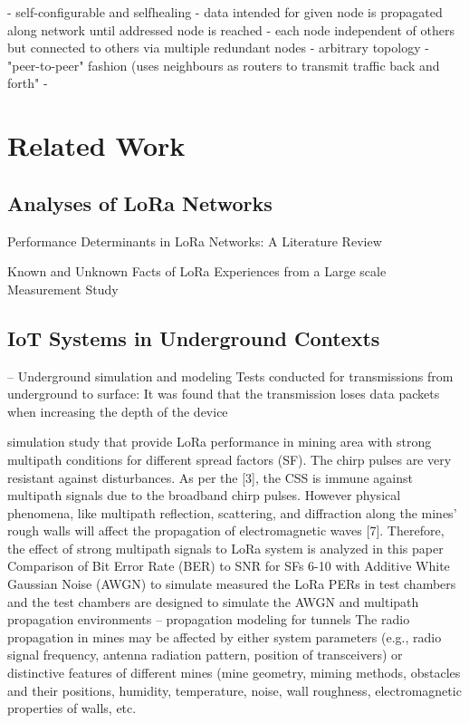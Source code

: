 \documentclass[a4paper,twoside,12pt]{report}
\begin{document}
- self-configurable and selfhealing
- data intended for given node is propagated along network until addressed node is reached
- each node independent of others but connected to others via multiple redundant nodes
- arbitrary topology
- "peer-to-peer" fashion (uses neighbours as routers to transmit traffic back and forth"
- 

\section{Related Work}


\subsection{Analyses of LoRa Networks}
Performance Determinants in LoRa Networks: A Literature Review \cite{Gkotsiopoulos2021PerformanceReview}

Known and Unknown Facts of LoRa Experiences from a Large scale Measurement Study \cite{Liando2019KnownStudy}

\subsection{IoT Systems in Underground Contexts}

-- Underground simulation and modeling
Tests conducted for transmissions from underground to surface: \citep{Villarim2022EvaluationApplications}
It was found that the transmission loses data packets when increasing the depth of the device

simulation study that provide LoRa performance in mining area with strong multipath conditions for different spread factors (SF). \citep{Emmanuel2019LoRaMines}
The chirp pulses are very resistant against disturbances. As per the [3], the CSS is immune against multipath signals due to the broadband chirp pulses. However physical phenomena, like multipath reflection, scattering, and diffraction along the mines’ rough walls will affect the propagation of electromagnetic waves [7]. Therefore, the effect of strong multipath signals to LoRa system is analyzed in this paper
Comparison of Bit Error Rate (BER) to SNR for SFs 6-10 with Additive White Gaussian Noise (AWGN) to simulate 
\citep{MineRadioPredictionModel3} measured the LoRa PERs in test chambers and the test chambers are designed to simulate the AWGN and multipath propagation environments
\citep{Hrovat2014ATunnels} -- propagation modeling for tunnels
The radio propagation in mines may be affected by either system parameters (e.g., radio signal frequency, antenna radiation pattern, position of transceivers) or distinctive features of different mines (mine geometry, miming methods, obstacles and their positions, humidity, temperature, noise, wall roughness, electromagnetic properties of walls, etc.
\end{document}
